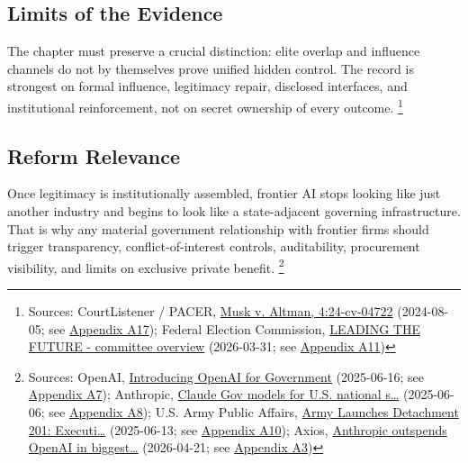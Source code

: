 \documentclass[
  american,
  11pt,
  letterpaper,
]{article}
\begin{document}
\subsection{Limits of the Evidence}\label{limits-of-the-evidence}

The chapter must preserve a crucial distinction: elite overlap and
influence channels do not by themselves prove unified hidden control.
The record is strongest on formal influence, legitimacy repair,
disclosed interfaces, and institutional reinforcement, not on secret
ownership of every outcome. \footnote{Sources: CourtListener / PACER,
  \href{https://www.courtlistener.com/docket/69013420/musk-v-altman/}{Musk
  v. Altman, 4:24-cv-04722} (2024-08-05; see
  \hyperref[appendix-a17-musk-v-altman-4-24-cv-04722]{Appendix A17});
  Federal Election Commission,
  \href{https://www.fec.gov/data/committee/C00916114/}{LEADING THE
  FUTURE - committee overview} (2026-03-31; see
  \hyperref[appendix-a11-leading-the-future-committee-overview]{Appendix
  A11})}

\subsection{Reform Relevance}\label{reform-relevance}

Once legitimacy is institutionally assembled, frontier AI stops looking
like just another industry and begins to look like a state-adjacent
governing infrastructure. That is why any material government
relationship with frontier firms should trigger transparency,
conflict-of-interest controls, auditability, procurement visibility, and
limits on exclusive private benefit. \footnote{Sources: OpenAI,
  \href{https://openai.com/global-affairs/introducing-openai-for-government/}{Introducing
  OpenAI for Government} (2025-06-16; see
  \hyperref[appendix-a7-introducing-openai-for-government]{Appendix
  A7}); Anthropic,
  \href{https://www.anthropic.com/news/claude-gov-models-for-u-s-national-security-customers}{Claude
  Gov models for U.S. national s\ldots{}} (2025-06-06; see
  \hyperref[appendix-a8-claude-gov-models-for-u-s-national-security-customers]{Appendix
  A8}); U.S. Army Public Affairs,
  \href{https://www.army.mil/article/286317/army_launches_detachment_201_executive_innovation_corps_to_drive_tech_transformation}{Army
  Launches Detachment 201: Executi\ldots{}} (2025-06-13; see
  \hyperref[appendix-a10-army-launches-detachment-201-executive-innovation-corps-to-drive-tech-transformation]{Appendix
  A10}); Axios,
  \href{https://www.axios.com/2026/04/21/anthropic-outspends-openai-biggest-lobbying-quarter}{Anthropic
  outspends OpenAI in biggest\ldots{}} (2026-04-21; see
  \hyperref[appendix-a3-anthropic-outspends-openai-in-biggest-ever-lobbying-quarter]{Appendix
  A3})}
\end{document}
